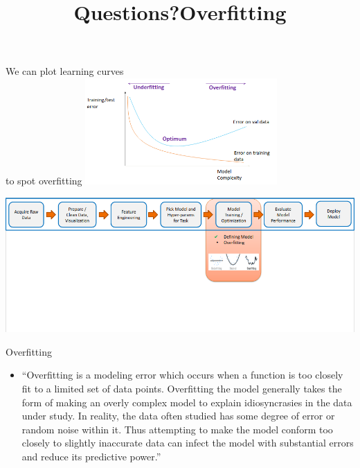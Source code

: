 \documentclass[aspectratio=169,14pt,usenames,dvipsnames]{beamer}
\begin{document}
\begin{frame}{We can plot learning curves \\ to spot overfitting}
\centering
\includegraphics[width=0.55\textwidth, height=0.6\textheight]{Images/AIML_OFG_13.png}
\end{frame}

{\1
\begin{frame}
	\title{Questions?}
	\maketitle
\end{frame}}


\begin{frame}

\includegraphics[width=1.0\textwidth, height=0.8\textheight]{Images/AIML_OFG_14.png}
\end{frame}


{\1
\begin{frame} \vspace{35pt}
	\title[Overfitting]{Overfitting}
	\maketitle
\end{frame}
}

\begin{frame}{Overfitting}
\begin{itemize}
\item “Overfitting is a modeling error which occurs when a function is too closely fit to a limited set of data points. Overfitting the model generally takes the form of making an overly complex model to explain idiosyncrasies in the data under study. In reality, the data often studied has some degree of error or random noise within it. Thus attempting to make the model conform too closely to slightly inaccurate data can infect the model with substantial errors and reduce its predictive power.”
\end{itemize}
\end{frame}
\end{document}
